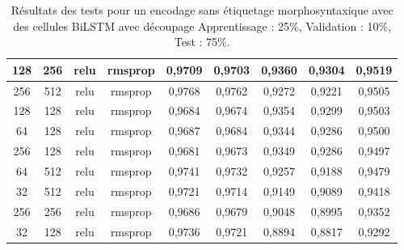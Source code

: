 \begin{table}[H]
{\begin{tabular}{|c|c|c|c|c|c|c|c|c|}
				128            & 256                     & relu                & rmsprop            & 0,9709                             & 0,9703                                & 0,9360                    & 0,9304                       & 0,9519                 \\ \hline
				256            & 512                     & relu                & rmsprop            & 0,9768                             & 0,9762                                & 0,9272                    & 0,9221                       & 0,9505                 \\ \hline
				128            & 128                     & relu                & rmsprop            & 0,9684                             & 0,9674                                & 0,9354                    & 0,9299                       & 0,9503                 \\ \hline
				64             & 128                     & relu                & rmsprop            & 0,9687                             & 0,9684                                & 0,9344                    & 0,9286                       & 0,9500                 \\ \hline
				256            & 128                     & relu                & rmsprop            & 0,9681                             & 0,9673                                & 0,9349                    & 0,9286                       & 0,9497                 \\ \hline
				64             & 512                     & relu                & rmsprop            & 0,9741                             & 0,9732                                & 0,9257                    & 0,9188                       & 0,9479                 \\ \hline
				32             & 512                     & relu                & rmsprop            & 0,9721                             & 0,9714                                & 0,9149                    & 0,9089                       & 0,9418                 \\ \hline
				256            & 256                     & relu                & rmsprop            & 0,9686                             & 0,9679                                & 0,9048                    & 0,8995                       & 0,9352                 \\ \hline
				32             & 128                     & relu                & rmsprop            & 0,9736                             & 0,9721                                & 0,8894                    & 0,8817                       & 0,9292                 \\ \hline
			\end{tabular}%
		}
		\caption{Résultats des tests pour un encodage sans étiquetage morphosyntaxique avec des cellules BiLSTM avec découpage Apprentissage : 25\%, Validation : 10\%, Test : 75\%.}
		\label{tab:bilstm_1}
	\end{table}
	
